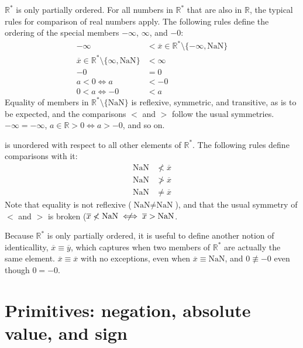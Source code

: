\documentclass[letterpaper,10pt]{article}
\newcommand{\NaN}{\text{NaN}}
\begin{document}
 $\mathbb{R}^*$ is only partially ordered. For all numbers in $\mathbb{R}^*$ that are also in $\mathbb{R}$, the typical rules for comparison of real numbers apply. The following rules define the ordering of the special members $-\infty$, $\infty$, and $-0$:
\begin{align}
 -\infty &< \overline{x} \in \mathbb{R}^* \setminus \{-\infty, \NaN\} \\
 \overline{x} \in \mathbb{R}^* \setminus \{\infty, \NaN\} &< \infty \\
 -0 &= 0 \\
 a < 0 \iff a &< -0 \\
 0 < a \iff -0 &< a
\end{align}
 Equality of members in $\mathbb{R}^* \setminus \{\NaN\}$ is reflexive, symmetric, and transitive, as is to be expected, and the comparisons $<$ and $>$ follow the usual symmetries. $-\infty = -\infty$, $a \in \mathbb{R} > 0 \iff a > -0$, and so on.

 \NaN is unordered with respect to all other elements of $\mathbb{R}^*$. The following rules define comparisons with it:
\begin{align}
 \NaN &\not< \overline{x} \\
 \NaN &\not> \overline{x} \\
 \NaN &\not= \overline{x}
\end{align}
 Note that equality is not reflexive ($\NaN \not= \NaN$), and that the usual symmetry of $<$ and $>$ is broken ($\overline{x} \not< \NaN \centernot\iff \overline{x} > \NaN$.

 Because $\mathbb{R}^*$ is only partially ordered, it is useful to define another notion of identicallity, $\overline{x} \equiv \overline{y}$, which captures when two members of $\mathbb{R}^*$ are actually the same element. $\overline{x} \equiv \overline{x}$ with no exceptions, even when $\overline{x} \equiv \NaN$, and $0 \not\equiv -0$ even though $0 = -0$.

\section{Primitives: negation, absolute value, and sign}
\end{document}
